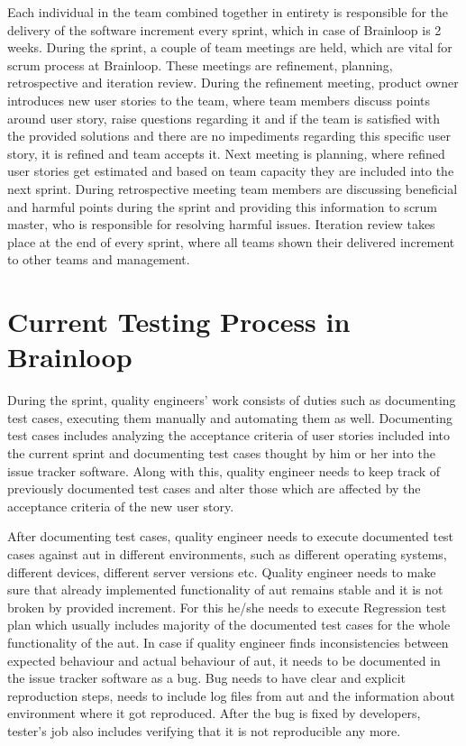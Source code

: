 \par
Each individual in the team combined together in entirety is responsible for the delivery of the software increment every sprint, which in case of Brainloop is 2 weeks. During the sprint, a couple of team meetings are held, which are vital for scrum process at Brainloop. These meetings are refinement, planning, retrospective and iteration review. During the refinement meeting, product owner introduces new user stories to the team, where team members discuss points around user story, raise questions regarding it and if the team is satisfied with the provided solutions and there are no impediments regarding this specific user story, it is refined and team accepts it. Next meeting is planning, where refined user stories get estimated and based on team capacity they are included into the next sprint. During retrospective meeting team members are discussing beneficial and harmful points during the sprint and providing this information to scrum master, who is responsible for resolving harmful issues. Iteration review takes place at the end of every sprint, where all teams shown their delivered increment to other teams and management.

\section{Current Testing Process in Brainloop}

\par
During the sprint, quality engineers' work consists of duties such as documenting test cases, executing them manually and automating them as well. Documenting test cases includes analyzing the acceptance criteria of user stories included into the current sprint and documenting test cases thought by him or her into the issue tracker software. Along with this, quality engineer needs to keep track of previously documented test cases and alter those which are affected by the acceptance criteria of the new user story.

\par
After documenting test cases, quality engineer needs to execute documented test cases against \acrlong{aut} in different environments, such as different operating systems, different devices, different server versions etc. Quality engineer needs to make sure that already implemented functionality of \acrlong{aut} remains stable and it is not broken by provided increment. For this he/she needs to execute Regression test plan which usually includes majority of the documented test cases for the whole functionality of the \acrlong{aut}. In case if quality engineer finds inconsistencies between expected behaviour and actual behaviour of \acrlong{aut}, it needs to be documented in the issue tracker software as a bug. Bug needs to have clear and explicit reproduction steps, needs to include log files from \acrlong{aut} and the information about environment where it got reproduced. After the bug is fixed by developers, tester's job also includes verifying that it is not reproducible any more.


